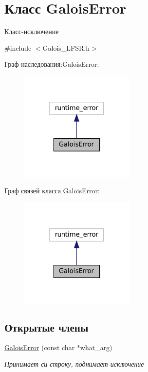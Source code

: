 \hypertarget{classGaloisError}{}\section{Класс Galois\+Error}
\label{classGaloisError}


Класс-\/исключение  




{\ttfamily \#include $<$Galois\+\_\+\+L\+F\+S\+R.\+h$>$}



Граф наследования\+:Galois\+Error\+:
\nopagebreak
\begin{figure}[H]
\begin{center}
\leavevmode
\includegraphics[width=163pt]{classGaloisError__inherit__graph}
\end{center}
\end{figure}


Граф связей класса Galois\+Error\+:
\nopagebreak
\begin{figure}[H]
\begin{center}
\leavevmode
\includegraphics[width=163pt]{classGaloisError__coll__graph}
\end{center}
\end{figure}
\subsection*{Открытые члены}
\begin{DoxyCompactItemize}
\item 
\hyperlink{classGaloisError_a23edc44b479adce2d5d7869d39807575}{Galois\+Error} (const char $\ast$what\+\_\+arg)
\begin{DoxyCompactList}\small\item\em Принимает си строку, поднимает исключение \end{DoxyCompactList}\end{DoxyCompactItemize}


